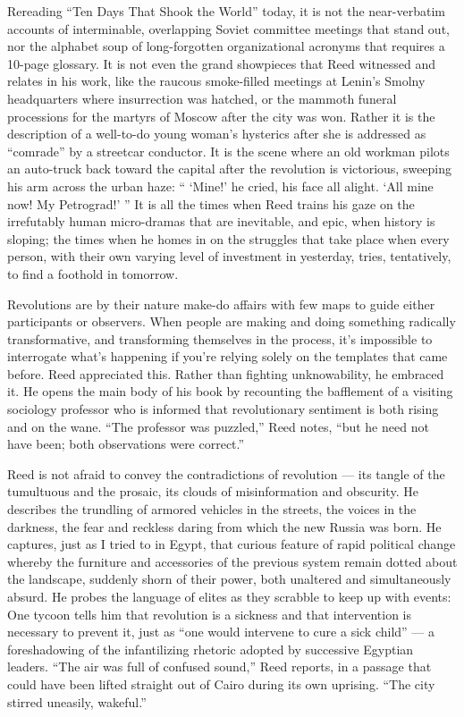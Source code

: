 Rereading ``Ten Days That Shook the World'' today, it is not the
near-verbatim accounts of interminable, overlapping Soviet committee
meetings that stand out, nor the alphabet soup of long-forgotten
organizational acronyms that requires a 10-page glossary. It is not even
the grand showpieces that Reed witnessed and relates in his work, like
the raucous smoke-filled meetings at Lenin's Smolny headquarters where
insurrection was hatched, or the mammoth funeral processions for the
martyrs of Moscow after the city was won. Rather it is the description
of a well-to-do young woman's hysterics after she is addressed as
``comrade'' by a streetcar conductor. It is the scene where an old
workman pilots an auto-truck back toward the capital after the
revolution is victorious, sweeping his arm across the urban haze: ``
`Mine!' he cried, his face all alight. `All mine now! My Petrograd!' ''
It is all the times when Reed trains his gaze on the irrefutably human
micro-dramas that are inevitable, and epic, when history is sloping; the
times when he homes in on the struggles that take place when every
person, with their own varying level of investment in yesterday, tries,
tentatively, to find a foothold in tomorrow.

Revolutions are by their nature make-do affairs with few maps to guide
either participants or observers. When people are making and doing
something radically transformative, and transforming themselves in the
process, it's impossible to interrogate what's happening if you're
relying solely on the templates that came before. Reed appreciated this.
Rather than fighting unknowability, he embraced it. He opens the main
body of his book by recounting the bafflement of a visiting sociology
professor who is informed that revolutionary sentiment is both rising
and on the wane. ``The professor was puzzled,'' Reed notes, ``but he
need not have been; both observations were correct.''

Reed is not afraid to convey the contradictions of revolution --- its
tangle of the tumultuous and the prosaic, its clouds of misinformation
and obscurity. He describes the trundling of armored vehicles in the
streets, the voices in the darkness, the fear and reckless daring from
which the new Russia was born. He captures, just as I tried to in Egypt,
that curious feature of rapid political change whereby the furniture and
accessories of the previous system remain dotted about the landscape,
suddenly shorn of their power, both unaltered and simultaneously absurd.
He probes the language of elites as they scrabble to keep up with
events: One tycoon tells him that revolution is a sickness and that
intervention is necessary to prevent it, just as ``one would intervene
to cure a sick child'' --- a foreshadowing of the infantilizing rhetoric
adopted by successive Egyptian leaders. ``The air was full of confused
sound,'' Reed reports, in a passage that could have been lifted straight
out of Cairo during its own uprising. ``The city stirred uneasily,
wakeful.''

